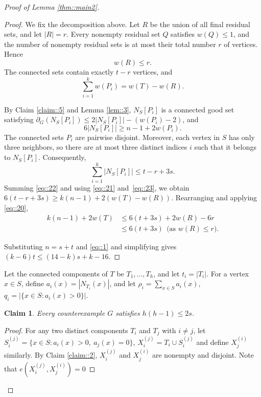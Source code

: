 \documentclass[11pt]{article}
\newtheorem{claim}{Claim}
\theoremstyle{definition}
\begin{document}
\begin{proof}[Proof of Lemma \ref{thm::main2}]
  \begin{proof}
    We fix the decomposition above. Let $R$ be the union of all final residual sets, and let $|R|=r$. Every nonempty residual set $Q$ satisfies $w(Q) \le 1$, and the number of nonempty residual sets is at most their total number $r$ of vertices. Hence
    \begin{equation}\label{eq::20}
      w(R)\le r.
    \end{equation}
    The connected sets contain exactly $t-r$ vertices, and
    \begin{equation}\label{eq::21}
      \sum_{i=1}^k w(P_i)=w(T)-w(R).
    \end{equation}

    By Claim \ref{claim::5} and Lemma \ref{lem::3}, $N_S[P_i]$ is a connected good set satisfying $\partial_G(N_S[P_i])\le2|N_S[P_i]|-(w(P_i)-2)$, and
    \begin{equation}\label{eq::22}
      6|N_S[P_i]|\geq n-1+2w(P_i).
    \end{equation}
    The connected sets $P_i$ are pairwise disjoint. Moreover, each vertex in $S$ has only three neighbors, so there are at most three distinct indices $i$ such that it belongs to $N_S[P_i]$. Consequently,
    \begin{equation}\label{eq::23}
      \sum_{i=1}^k|N_S[P_i]|\leq t-r+3s.
    \end{equation}
    Summing \eqref{eq::22} and using \eqref{eq::21} and~\eqref{eq::23}, we obtain $6(t-r+3s) \geq k(n-1)+2(w(T)-w(R))$.
    Rearranging and applying \eqref{eq::20},
    \begin{equation*}
      \begin{aligned}
        k(n-1)+2w(T) & \leq 6(t+3s)+2w(R)-6r                    \\
                     & \leq 6(t+3s) ~~\mbox{(as $w(R)\leq r$)}.
      \end{aligned}
    \end{equation*}

    Substituting $n=s+t$ and \eqref{eq::1} and simplifying gives $(k-6)t\le(14-k)s+k-16$.
  \end{proof}

  Let the connected components of $T$ be $T_1,\dots,T_h$, and let $t_i=|T_i|$. For a vertex $x\in S$, define $a_i(x)=|N_{T_i}(x)|$, and let $\rho_i=\sum_{x\in S}a_i(x)$, $q_i=|\{x\in S:a_i(x)>0\}|$.

  \begin{claim}\label{claim::8}
    Every counterexample  $G$ satisfies $h(h-1)\leq 2s$.
  \end{claim}
  \begin{proof}
    For any two distinct components $T_i$ and $T_j$ with $i\neq j$, let $S_i^{(j)}=\{x\in S:a_i(x)>0,\ a_j(x)=0\}$, $X_i^{(j)}=T_i\cup S_i^{(j)}$
    and define $X_j^{(i)}$ similarly.  By Claim \ref{claim::2}, $X_i^{(j)}$ and $X_j^{(i)}$ are nonempty and disjoint. Note that $e(X_i^{(j)},X_j^{(i)})=0$


\end{proof}
\end{proof}
\end{document}
